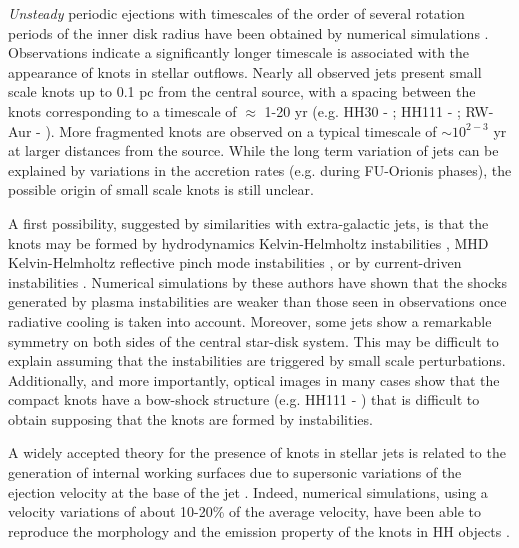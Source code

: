 \documentclass{emulateapj}
\begin{document}
\emph{Unsteady} periodic ejections  
with timescales of the order of several rotation periods of the inner disk radius
have been obtained by numerical simulations \citep[e.g.][]{ouy97,goo99,mat02}.
Observations indicate a significantly longer timescale is associated with the
appearance of knots in stellar outflows. 
Nearly all observed jets present small scale knots
 up to 0.1 pc from the central source, with a spacing between the knots 
 corresponding to a timescale of $\approx$ 1-20 yr 
(e.g. HH30 - \citealt{bur96}; HH111 - \citealt{rei92}; RW-Aur - 
\citealt{lop03}). More 
fragmented knots are observed on a typical timescale of $\sim 10^{2-3}$ yr
at larger distances from the source.
While the long term variation of jets can be 
explained by variations in the accretion rates (e.g. during FU-Orionis phases),
the possible origin of small scale knots is still unclear.

A first possibility, suggested by similarities with extra-galactic jets,
is that the knots may be formed by hydrodynamics Kelvin-Helmholtz instabilities \citep{mic98},
MHD Kelvin-Helmholtz reflective pinch mode instabilities \citep[]{cer99},
or by current-driven instabilities \citep[]{fra00}.
Numerical simulations by these authors have shown that the shocks generated
by plasma instabilities are weaker than those seen in observations once 
radiative cooling is taken into account.
Moreover, some jets \citep[e.g. HH212 -][]{zin98} show a remarkable symmetry
on both sides of the central star-disk system. This may be difficult to explain
assuming that the instabilities are triggered by small scale perturbations.
Additionally, and more importantly, optical images in many cases show 
that the compact knots have a bow-shock structure (e.g. HH111 - \citealt{rei92}) 
that is difficult to obtain supposing that the knots are formed
by instabilities.

A widely accepted theory for the presence of knots in
stellar jets is related to the generation of internal working surfaces due 
to supersonic variations of the ejection velocity at the base of the 
jet \citep{rag90}.
Indeed, numerical simulations, using a velocity variations
of about 10-20\% of the average velocity,
have been able to reproduce  
the morphology and the emission property of the knots in HH objects 
\citep[e.g.][]{esq07}.
\end{document}

